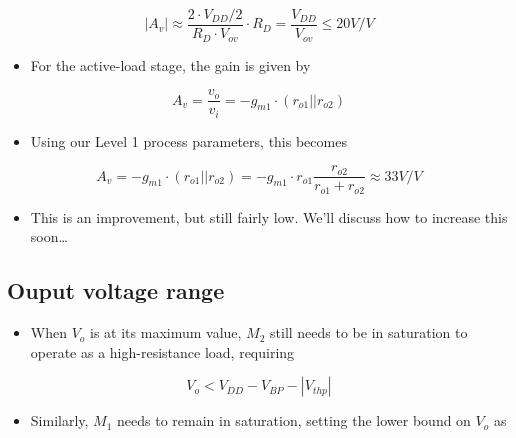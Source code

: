 \documentclass[11pt]{article}
\providecommand{\tightlist}{%
      \setlength{\itemsep}{0pt}\setlength{\parskip}{0pt}}
\begin{document}
\begin{equation}
|A_v| \approx \dfrac{2\cdot V_{DD}/2}{R_D\cdot V_{ov}}\cdot R_D = \dfrac{V_{DD}}{V_{ov}} \leq 20V/V
\end{equation}

\begin{itemize}
\tightlist
\item
  For the active-load stage, the gain is given by
\end{itemize}

\begin{equation}
A_v = \dfrac{v_o}{v_i} = -g_{m1} \cdot (r_{o1} || r_{o2})
\end{equation}

\begin{itemize}
\tightlist
\item
  Using our Level 1 process parameters, this becomes
\end{itemize}

\begin{equation}
A_v = -g_{m1} \cdot (r_{o1} || r_{o2}) = -g_{m1}\cdot r_{o1} \dfrac{r_{o2}}{r_{o1} + r_{o2}}\approx 33 V/V
\end{equation}

\begin{itemize}
\tightlist
\item
  This is an improvement, but still fairly low. We'll discuss how to
  increase this soon\ldots{}
\end{itemize}

    \hypertarget{ouput-voltage-range}{%
\subsection{Ouput voltage range}\label{ouput-voltage-range}}

    \begin{itemize}
\tightlist
\item
  When \(V_o\) is at its maximum value, \(M_2\) still needs to be in
  saturation to operate as a high-resistance load, requiring
\end{itemize}

\begin{equation}
V_o < V_{DD} - V_{BP} - |V_{thp}|
\end{equation}

\begin{itemize}
\tightlist
\item
  Similarly, \(M_1\) needs to remain in saturation, setting the lower
  bound on \(V_o\) as
\end{itemize}
\end{document}
